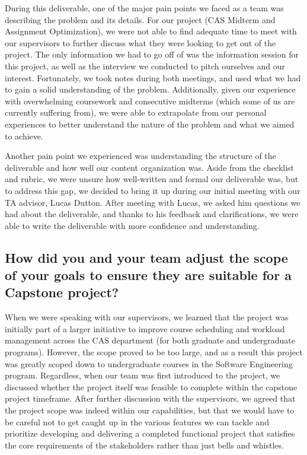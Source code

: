 \documentclass{article}
\begin{document}
During this deliverable, one of the major pain points we faced as a team was describing the problem and its details. 
For our project (CAS Midterm and Assignment Optimization), we were not able to find adequate time to meet with our supervisors 
to further discuss what they were looking to get out of the project. The only information we had to go off of was the information session for this project, 
as well as the interview we conducted to pitch ourselves and our interest. Fortunately, we took notes during both meetings, 
and used what we had to gain a solid understanding of the problem. Additionally, given our experience with overwhelming coursework and 
consecutive midterms (which some of us are currently suffering from), we were able to extrapolate from our personal experiences 
to better understand the nature of the problem and what we aimed to achieve.

\bigskip
Another pain point we experienced was understanding the structure of the deliverable and how well our content organization was. 
Aside from the checklist and rubric, we were unsure how well-written and formal our deliverable was, but to address this gap, 
we decided to bring it up during our initial meeting with our TA advisor, Lucas Dutton. After meeting with Lucas, we asked him questions 
we had about the deliverable, and thanks to his feedback and clarifications, we were able to write the deliverable with more confidence and understanding. 

\subsection*{How did you and your team adjust the scope of your goals to ensure they are suitable for a Capstone project?}
When we were speaking with our supervisors, we learned that the project was initially part of a larger initiative to improve course scheduling and workload management across the CAS department 
(for both graduate and undergraduate programs). However, the scope proved to be too large, and as a result this project was greatly scoped down to undergraduate courses in the Software Engineering program.
Regardless, when our team was first introduced to the project, we discussed whether the project itself was feasible to complete within the capstone project timeframe. 
After further discussion with the supervisors, we agreed that the project scope was indeed within our capabilities, but that 
we would have to be careful not to get caught up in the various features we can tackle and prioritize developing and delivering a completed functional project that 
satisfies the core requirements of the stakeholders rather than just bells and whistles.
\end{document}
